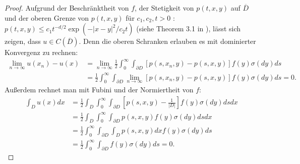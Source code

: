 \documentclass[10pt, a4paper, leqno, twoside, bibliography=totocnumbered, final]{scrartcl}
\theoremstyle{definition}
\theoremstyle{plain}%
\theoremstyle{remark}
\begin{document}
\begin{proof}
Aufgrund der Beschränktheit von $ f $, der Stetigkeit von $ p(t,x,y) $ auf $ \overline{D} $ und der oberen Grenze von $ p(t,x,y) $ für $ c_1, c_2, t > 0 $ : $ p(t,x,y) \leq c_1 t^{-d/2} \exp(-|x-y|^2 / c_2t) $ (siehe Theorem 3.1 in \cite{Fukushima}), lässt sich zeigen, dass $ u \in C(\overline{D}) $. Denn die oberen Schranken erlauben es mit dominierter Konvergenz zu rechnen:
\begin{align*}
\lim_{n \to \infty} u(x_n) - u(x) & = \lim_{n \to \infty} \frac{1}{2} \int_0^{\infty} \int_{\partial D} \left[ p(s,x_n,y) - p(s,x,y) \right] f(y) \sigma(dy) ds \\
& = \frac{1}{2} \int_0^{\infty} \int_{\partial D} \lim_{n \to \infty } \left[ p(s,x_n,y) - p(s,x,y) \right] f(y) \sigma(dy) ds = 0 .
\end{align*}
Außerdem rechnet man mit Fubini und der Normiertheit von $ f $: 
\begin{align*}
\int_D u(x) dx & = \frac{1}{2} \int_D \int_0^{\infty} \int_{\partial D} \left[ p(s,x,y) -\frac{1}{|D|} \right] f(y) \sigma(dy) ds dx \\
& = \frac{1}{2} \int_D \int_0^{\infty} \int_{\partial D}  p(s,x,y) f(y) \sigma(dy) ds dx \\
& = \frac{1}{2} \int_0^{\infty} \int_{\partial D} \int_D  p(s,x,y) dx f(y) \sigma(dy) ds \\
& = \frac{1}{2} \int_0^{\infty} \int_{\partial D}  f(y) \sigma(dy) ds = 0.
\end{align*}


\end{proof}
\end{document}
